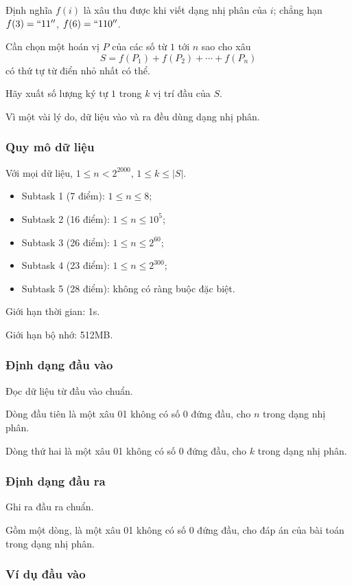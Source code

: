 \documentclass[11pt]{article}
\begin{document}
Định nghĩa \(f(i)\) là xâu thu được khi viết dạng nhị phân của \(i\); chẳng hạn
\(f(3)=``11''\), \(f(6)=``110''\).

Cần chọn một hoán vị \(P\) của các số từ \(1\) tới \(n\) sao cho xâu
\[
S=f(P_1)+f(P_2)+\cdots+f(P_n)
\]
có thứ tự từ điển nhỏ nhất có thể.

Hãy xuất số lượng ký tự \(1\) trong \(k\) vị trí đầu của \(S\).

Vì một vài lý do, dữ liệu vào và ra đều dùng dạng nhị phân.

\subsubsection{Quy mô dữ liệu}

Với mọi dữ liệu, \(1\le n<2^{2000}\), \(1\le k\le |S|\).

\begin{itemize}
  \item Subtask 1 (7 điểm): \(1\le n\le 8\);
  \item Subtask 2 (16 điểm): \(1\le n\le 10^5\);
  \item Subtask 3 (26 điểm): \(1\le n\le 2^{60}\);
  \item Subtask 4 (23 điểm): \(1\le n\le 2^{300}\);
  \item Subtask 5 (28 điểm): không có ràng buộc đặc biệt.
\end{itemize}

Giới hạn thời gian: 1s.

Giới hạn bộ nhớ: 512MB.

\subsubsection{Định dạng đầu vào}

Đọc dữ liệu từ đầu vào chuẩn.

Dòng đầu tiên là một xâu 01 không có số 0 đứng đầu, cho \(n\) trong dạng nhị
phân.

Dòng thứ hai là một xâu 01 không có số 0 đứng đầu, cho \(k\) trong dạng nhị
phân.

\subsubsection{Định dạng đầu ra}

Ghi ra đầu ra chuẩn.

Gồm một dòng, là một xâu 01 không có số 0 đứng đầu, cho đáp án của bài toán
trong dạng nhị phân.

\subsubsection{Ví dụ đầu vào}
\end{document}
